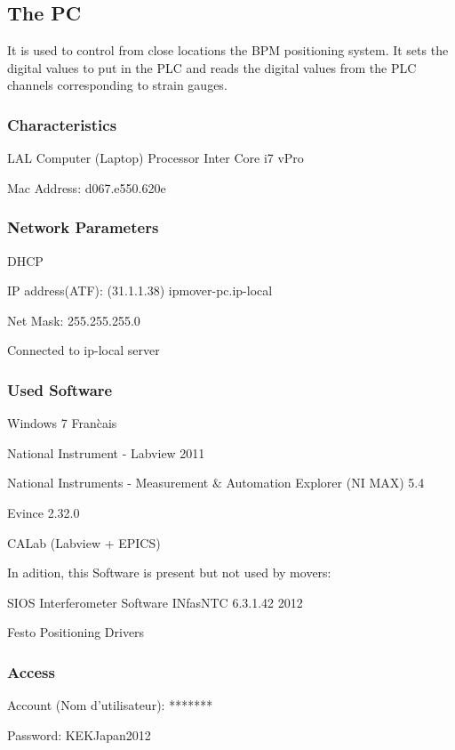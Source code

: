 \subsection{The PC}
It is used to control from close locations the BPM positioning system. It sets the digital values to put in the PLC and reads the digital values from the PLC channels corresponding to strain gauges.\par
\subsubsection{Characteristics}
LAL Computer (Laptop)
Processor Inter Core i7 vPro\par
Mac Address: d067.e550.620e\par
\subsubsection{Network Parameters}
DHCP\par
IP address(ATF): (31.1.1.38) ipmover-pc.ip-local\par
Net Mask: 255.255.255.0\par
Connected to ip-local server\par
\subsubsection{Used Software}
Windows 7 Fran\`cais\par
National Instrument - Labview 2011\par
National Instruments - Measurement $\&$ Automation Explorer (NI MAX) 5.4\par
Evince 2.32.0\par
CALab (Labview + EPICS) \cite{CALab}\par
In adition, this Software is present but not used by movers:\par
SIOS Interferometer Software INfasNTC 6.3.1.42 2012\par
Festo Positioning Drivers\par
\subsubsection{Access}
Account (Nom d'utilisateur): *******\par
Password: KEKJapan2012\par
